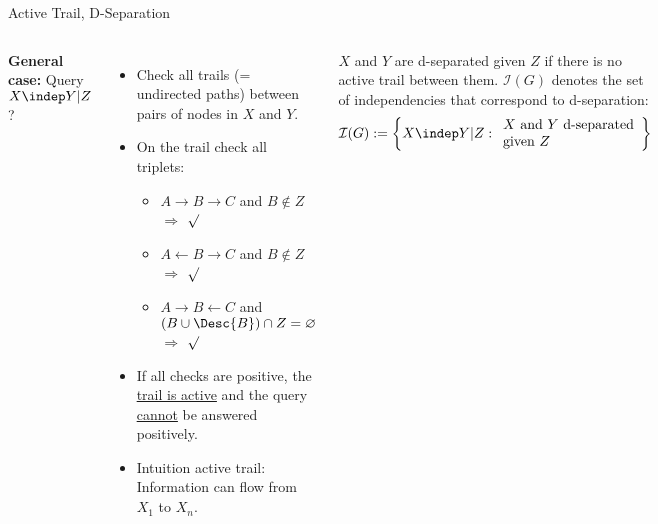 \begin{frame}{Active Trail, D-Separation}
\begin{columns}
\textbf{General case:} Query $X \indep Y | Z$?\\
\begin{itemize}
\pause \item Check all trails (= undirected paths) between pairs of nodes in $X$ and $Y$.
\pause \item On the trail check all triplets:
\begin{itemize}
    \pause \item $A \rightarrow B \rightarrow C$ and $B \notin Z$ 
        $\Rightarrow$ $\surd$
    \pause \item $A \leftarrow B \rightarrow C$ and $B \notin Z$ 
        $\Rightarrow$ $\surd$
    \pause \item $A \rightarrow B \leftarrow C$ and $(B \cup \Desc{B}) \cap Z = \varnothing$ 
        $\Rightarrow$ $\surd$
\end{itemize}
\pause \item If all checks are positive, the \underline{trail is active} and the query \underline{cannot} be answered positively.
\pause \item Intuition active trail: Information can flow from $X_1$ to $X_n$.
\end{itemize}
\pause
\begin{definition}[D-Separation]
$X$ and $Y$ are d-separated given $Z$ if there is no active trail between them.
$\mathcal{I}(G)$ denotes the set of independencies that correspond to d-separation:
\begin{equation}
    \mathcal{I}(G) := \left\{ X \indep Y | Z: \begin{array}{l} X \text{ and } Y \text{ d-separated} \\ \text{given } Z \end{array} \right\}
\end{equation}
\end{definition}
    \pause
    \begin{center}
\end{center}
\end{columns}
\end{frame}

